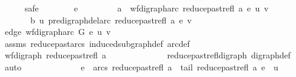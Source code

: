 \begin{isabellebody}
\ \ \ \ \isamarkupfalse%
\ safe\isanewline
\ \ \ \ \ \ \isamarkupfalse%
\ e\ \isanewline
\ \ \ \ \ \ \isamarkupfalse%
\ a{\isacharcolon}{\kern0pt}\ {\isachardoublequoteopen}\ wf{\isacharunderscore}{\kern0pt}digraph{\isachardot}{\kern0pt}arc\ {\isacharparenleft}{\kern0pt}reduce{\isacharunderscore}{\kern0pt}past{\isacharunderscore}{\kern0pt}refl\ a{\isacharparenright}{\kern0pt}\ e\ {\isacharparenleft}{\kern0pt}u{\isacharcomma}{\kern0pt}\ v{\isacharparenright}{\kern0pt}{\isachardoublequoteclose}\isanewline
\ \ \ \ \ \ \ b{\isacharcolon}{\kern0pt}\ {\isachardoublequoteopen}u\ {\isasymrightarrow}\isactrlsup {\isacharasterisk}{\kern0pt}\isactrlbsub pre{\isacharunderscore}{\kern0pt}digraph{\isachardot}{\kern0pt}del{\isacharunderscore}{\kern0pt}arc\ {\isacharparenleft}{\kern0pt}reduce{\isacharunderscore}{\kern0pt}past{\isacharunderscore}{\kern0pt}refl\ a{\isacharparenright}{\kern0pt}\ e\isactrlesub \ v{\isachardoublequoteclose}\isanewline
\ \ \ \ \ \ \isamarkupfalse%
\ edge{\isacharcolon}{\kern0pt}\ {\isachardoublequoteopen}wf{\isacharunderscore}{\kern0pt}digraph{\isachardot}{\kern0pt}arc\ G\ e\ {\isacharparenleft}{\kern0pt}u{\isacharcomma}{\kern0pt}\ v{\isacharparenright}{\kern0pt}{\isachardoublequoteclose}\isanewline
\ \ \ \ \ \ \ \ \ \ \isamarkupfalse%
\ assms\ reduce{\isacharunderscore}{\kern0pt}past{\isacharunderscore}{\kern0pt}arcs{}\ induced{\isacharunderscore}{\kern0pt}subgraph{\isacharunderscore}{\kern0pt}def\ arc{\isacharunderscore}{\kern0pt}def\ \isanewline
\ \ \ \ \ \ \ \ \isamarkupfalse%
\ {\isacharminus}{\kern0pt}\isanewline
\ \ \ \ \ \ \ \ \ \ \isamarkupfalse%
\ {\isachardoublequoteopen}wf{\isacharunderscore}{\kern0pt}digraph\ {\isacharparenleft}{\kern0pt}reduce{\isacharunderscore}{\kern0pt}past{\isacharunderscore}{\kern0pt}refl\ a{\isacharparenright}{\kern0pt}{\isachardoublequoteclose}\isanewline
\ \ \ \ \ \ \ \ \ \ \ \ \isamarkupfalse%
\ reduce{\isacharunderscore}{\kern0pt}past{\isacharunderscore}{\kern0pt}refl{\isacharunderscore}{\kern0pt}digraph\ digraph{\isacharunderscore}{\kern0pt}def\ \isamarkupfalse%
\ auto\isanewline
\ \ \ \ \ \ \ \ \ \ \isamarkupfalse%
\ \isamarkupfalse%
\ {\isachardoublequoteopen}e\ {\isasymin}\ arcs\ {\isacharparenleft}{\kern0pt}reduce{\isacharunderscore}{\kern0pt}past{\isacharunderscore}{\kern0pt}refl\ a{\isacharparenright}{\kern0pt}\ {\isasymand}\ tail\ {\isacharparenleft}{\kern0pt}reduce{\isacharunderscore}{\kern0pt}past{\isacharunderscore}{\kern0pt}refl\ a{\isacharparenright}{\kern0pt}\ e\ {\isacharequal}{\kern0pt}\ u\isanewline

\end{isabellebody}
